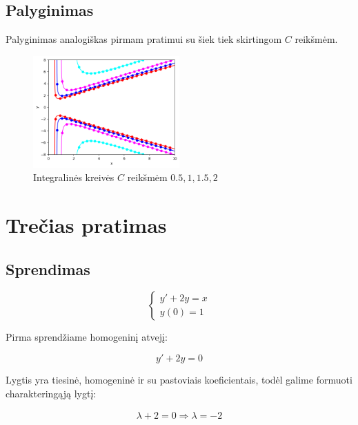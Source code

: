 \documentclass[11pt]{article}
\begin{document}
\subsection{Palyginimas}

Palyginimas analogiškas pirmam pratimui su šiek tiek skirtingom $C$ reikšmėm.

\begin{figure}[h!]
    \centering
    \includegraphics[width=0.5\textwidth]{2.png}
    \caption{Integralinės kreivės $C$ reikšmėm $0.5, 1, 1.5, 2$}
    \label{fig:pvz2}
\end{figure}

\newpage
\section{Trečias pratimas}

\subsection{Sprendimas}

\begin{equation}
\begin{cases}
     y'+2y=x  \\
     y(0)=1 
\end{cases}
\end{equation}

Pirma sprendžiame homogeninį atvejį:

\begin{equation}
y'+2y=0
\end{equation}

Lygtis yra tiesinė, homogeninė ir su pastoviais koeficientais, todėl galime formuoti charakteringąją lygtį:

\begin{equation}
\begin{split}
\lambda+2=0 \Rightarrow \lambda=-2
\end{split}
\end{equation}
\end{document}
